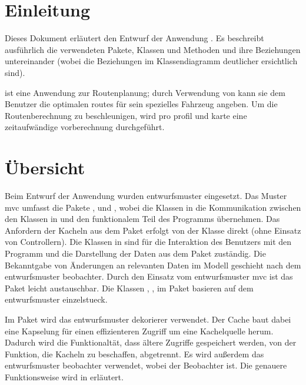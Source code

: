 \documentclass[a4paper, 11pt]{article}
\begin{document}
\section{Einleitung}

Dieses Dokument erläutert den Entwurf der Anwendung \routeKIT. %
Es beschreibt ausführlich die verwendeten Pakete, Klassen und Methoden und ihre Beziehungen untereinander (wobei die Beziehungen im Klassendiagramm deutlicher ersichtlich sind).

\routeKIT ist eine Anwendung zur Routenplanung; durch Verwendung von  kann sie dem Benutzer die optimalen \glspl{route} für sein spezielles Fahrzeug angeben.
Um die Routenberechnung zu beschleunigen, wird pro \gls{profil} und \gls{karte} eine zeitaufwändige \gls{vorberechnung} durchgeführt.


\section{Übersicht}

Beim Entwurf der Anwendung \routeKIT wurden \gls{entwurfsmuster} eingesetzt.
Das Muster \gls{mvc} umfasst die Pakete ,  und , wobei die Klassen in  die Kommunikation zwischen den Klassen in  und den funktionalem Teil des Programms übernehmen.
Das Anfordern der Kacheln aus dem Paket  erfolgt von der Klasse  direkt (ohne Einsatz von Controllern).
Die Klassen in  sind für die Interaktion des Benutzers mit den Programm und die Darstellung der Daten aus dem Paket  zuständig.
Die Bekanntgabe von Änderungen an relevanten Daten im Modell geschieht nach dem \gls{entwurfsmuster} \gls{beobachter}.
Durch den Einsatz vom \gls{entwurfsmuster} \gls{mvc} ist das Paket  leicht austauschbar.
Die Klassen , ,  im Paket  basieren auf dem \gls{entwurfsmuster} \gls{einzelstueck}. %

Im Paket  wird das \gls{entwurfsmuster} \gls{dekorierer} verwendet.
Der Cache baut dabei eine Kapselung für einen effizienteren Zugriff um eine Kachelquelle herum.
Dadurch wird die Funktionaltät, dass ältere Zugriffe gespeichert werden, von der Funktion, die Kacheln zu beschaffen, abgetrennt.
Es wird außerdem das \gls{entwurfsmuster} \gls{beobachter} verwendet, wobei  der Beobachter ist. Die genauere Funktionsweise wird in  erläutert.
\end{document}
